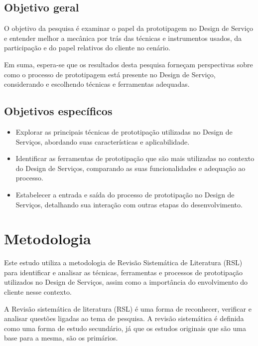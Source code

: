 \subsection{Objetivo geral}

O objetivo da pesquisa é examinar o papel da prototipagem no Design de Serviço e entender melhor a mecânica por trás das técnicas e instrumentos usados, da participação e do papel relativos do cliente no cenário.

Em suma, espera-se que os resultados desta pesquisa forneçam perspectivas sobre como o processo de prototipagem está presente no Design de Serviço, considerando e escolhendo técnicas e ferramentas adequadas.

\subsection{Objetivos específicos}

\begin{itemize}
	\item Explorar as principais técnicas de prototipação utilizadas no Design de Serviços, abordando suas características e aplicabilidade.
	
	\item Identificar as ferramentas de prototipação que são mais utilizadas no contexto do Design de Serviços, comparando as suas funcionalidades e adequação ao processo.
	
	\item Estabelecer a entrada e saída do processo de prototipação no Design de Serviços, detalhando sua interação com outras etapas do desenvolvimento.
\end{itemize}

\section{Metodologia}

Este estudo utiliza a metodologia de Revisão Sistemática de Literatura (RSL) para identificar e analisar as técnicas, ferramentas e processos de prototipação utilizados no Design de Serviços, assim como a importância do envolvimento do cliente nesse contexto. 

A Revisão sistemática de literatura (RSL) é uma forma de reconhecer, verificar e analisar questões ligadas ao tema de pesquisa. A revisão sistemática é definida como uma forma de estudo secundário, já que os estudos originais que são uma base para a mesma, são os primários.

